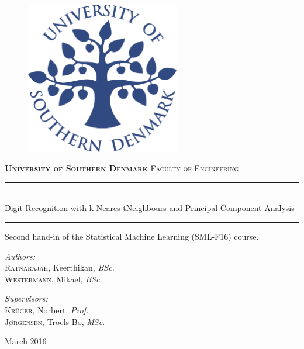 %
\begin{titlepage}
\begin{center}
\begin{figure}[h]
\centering
\includegraphics[width=0.6\textwidth]{graphics/forside.png}
\end{figure}
\vskip1cm
{
\bfseries
\textsc{\huge University of Southern Denmark}
\vskip0.4cm
}
\textsc{\LARGE Faculty of Engineering}
\vskip0.8cm
{
\bfseries
\rule{\linewidth}{0.5mm} \\[0.4cm]
{\huge Digit Recognition with k-Neares tNeighbours and Principal Component Analysis \\[0.35cm] }
\rule{\linewidth}{0.5mm}
}
\vskip0.5cm
{Second hand-in of the Statistical Machine Learning (SML-F16) course.}
\vskip2cm

\begin{minipage}[t]{0.4\textwidth}
\begin{flushleft}
\large \emph{Authors:}\\
\textsc{Ratnarajah}, Keerthikan, \textit{BSc.}\\
\textsc{Westermann}, Mikael, \textit{BSc.}
\end{flushleft}
\end{minipage}
\begin{minipage}[t]{0.4\textwidth}
\begin{flushright}
\large \emph{Supervisors:}\\
\textsc{Krüger}, Norbert, \textit{Prof.} \\
\textsc{Jørgensen}, Troels Bo, \textit{MSc.} 
\end{flushright}
\end{minipage}
\vfill
{March 2016}

\end{center}
\end{titlepage}